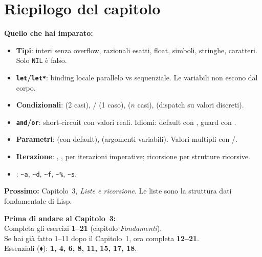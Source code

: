 \section*{Riepilogo del capitolo}

\begin{tcolorbox}[
  enhanced,
  colback=csBlue!5, colframe=csBlue!40,
  arc=4pt, boxrule=0.6pt,
  left=14pt, right=14pt, top=12pt, bottom=12pt,
  before skip=16pt, after skip=16pt
]
\textbf{Quello che hai imparato:}

\medskip
\begin{itemize}
  \item \textbf{Tipi}: interi senza overflow, razionali esatti, float,
        simboli, stringhe, caratteri. Solo \texttt{NIL} è falso.
  \item \textbf{\texttt{let}/\texttt{let*}}: binding locale parallelo
        vs sequenziale. Le variabili non escono dal corpo.
  \item \textbf{Condizionali}:  (2 casi),
        / (1 caso),  ($n$ casi),
         (dispatch su valori discreti).
  \item \textbf{\texttt{and}/\texttt{or}}: short-circuit con valori reali.
        Idiomi: default con , guard con .
  \item \textbf{Parametri}:  (con default),
         (argomenti variabili).
        Valori multipli con /.
  \item \textbf{Iterazione}: , , 
        per iterazioni imperative; ricorsione per strutture ricorsive.
  \item \textbf{}: \texttt{\textasciitilde a},
        \texttt{\textasciitilde d}, \texttt{\textasciitilde f},
        \texttt{\textasciitilde \%}, \texttt{\textasciitilde s}.
\end{itemize}

\medskip
\textbf{Prossimo:} Capitolo~3, \emph{Liste e ricorsione}.
Le liste sono la struttura dati fondamentale di Lisp.
\end{tcolorbox}

\begin{workbook}
\textbf{Prima di andare al Capitolo~3:}\\[4pt]
Completa gli esercizi \textbf{1--21} (capitolo \emph{Fondamenti}).\\[4pt]
Se hai già fatto 1--11 dopo il Capitolo~1, ora completa \textbf{12--21}.\\[4pt]
Essenziali ($\blacklozenge$): \textbf{1, 4, 6, 8, 11, 15, 17, 18}.
\end{workbook}
